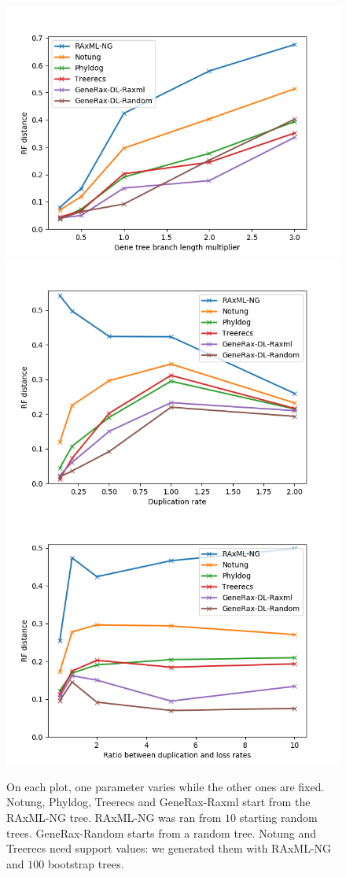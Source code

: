 \documentclass[12pt,a4paper]{article}
\begin{document}
\begin{figure}
\includegraphics[scale=0.5]{bl.png}
\includegraphics[scale=0.5]{rates.png}
\includegraphics[scale=0.5]{dl_ratio.png}
\caption{On each plot, one parameter varies while the other ones are fixed. Notung, Phyldog, Treerecs and GeneRax-Raxml start from the RAxML-NG tree. RAxML-NG was ran from $10$ starting random trees. GeneRax-Random starts from a random tree. Notung and Treerecs need support values: we generated them with RAxML-NG and $100$ bootstrap trees.}
\end{figure}
\end{document}
